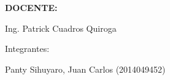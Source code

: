 \documentclass[12pt, letterpaper]{article}
\begin{document}
\begin{titlepage}
\begin{center}
		\vspace*{0.3in}
			\begin{large}
				\textbf{DOCENTE:} \\
			\end{large}

		\vspace*{0.1in}
			\begin{large}
				Ing. Patrick Cuadros Quiroga \\
			\end{large}

		\vspace*{0.2in}
			\vspace*{0.1in}
				\begin{large}
					Integrantes: \\
					\begin{flushleft}
						Panty Sihuyaro, Juan Carlos	\hfill	(2014049452) \\
					\end{flushleft}
				\end{large}
	\end{center}
\end{titlepage}

\tableofcontents %
	\thispagestyle{empty} %
		\newpage
			\setcounter{page}{1}%
				
				
				
				
\end{document}
